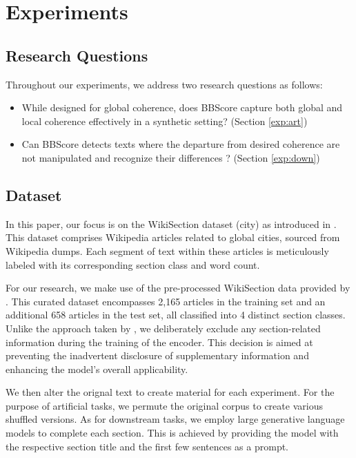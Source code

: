\documentclass[letterpaper]{article} %
\begin{document}
\section{Experiments}
\subsection{Research Questions}
Throughout our experiments, we address two research questions as follows:
\begin{itemize}
    \item While designed for global coherence, does BBScore capture both global and local coherence effectively in a synthetic setting? (Section \ref{exp:art})
    \item Can BBScore detects texts where the departure from desired coherence are not manipulated and recognize their differences ? (Section \ref{exp:down})
\end{itemize}



\subsection{Dataset}

In this paper, our focus is on the WikiSection dataset (city) as introduced in \citep{arnold-etal-2019-sector}. This dataset comprises Wikipedia articles related to global cities, sourced from Wikipedia dumps. Each segment of text within these articles is meticulously labeled with its corresponding section class and word count.

For our research, we make use of the pre-processed WikiSection data provided by \citet{wang2023language}. This curated dataset encompasses 2,165 articles in the training set and an additional 658 articles in the test set, all classified into 4 distinct section classes. Unlike the approach taken by \citet{wang2023language}, we deliberately exclude any section-related information during the training of the encoder. This decision is aimed at preventing the inadvertent disclosure of supplementary information and enhancing the model's overall applicability.

We then alter the orignal text to create material for each experiment. For the purpose of artificial tasks, we permute the original corpus to create various shuffled versions. As for downstream tasks, we employ large generative language models to complete each section. This is achieved by providing the model with the respective section title and the first few sentences as a prompt.
\end{document}
